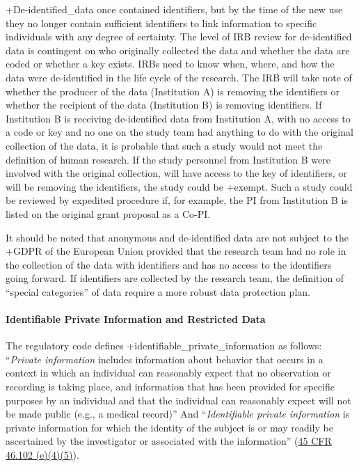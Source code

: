 \documentclass[
]{book}
\begin{document}
+De-identified\_data\textbar{} once contained identifiers, but by the time of the new use they no longer contain sufficient identifiers to link information to specific individuals with any degree of certainty. The level of IRB review for de-identified data is contingent on who originally collected the data and whether the data are coded or whether a key exists. IRBs need to know when, where, and how the data were de-identified in the life cycle of the research. The IRB will take note of whether the producer of the data (Institution A) is removing the identifiers or whether the recipient of the data (Institution B) is removing identifiers. If Institution B is receiving de-identified data from Institution A, with no access to a code or key and no one on the study team had anything to do with the original collection of the data, it is probable that such a study would not meet the definition of human research. If the study personnel from Institution B were involved with the original collection, will have access to the key of identifiers, or will be removing the identifiers, the study could be +exempt\textbar. Such a study could be reviewed by expedited procedure if, for example, the PI from Institution B is listed on the original grant proposal as a Co-PI.

\begin{bbox}

It should be noted that anonymous and de-identified data are not subject to the +GDPR\textbar{} of the European Union provided that the research team had no role in the collection of the data with identifiers and has no access to the identifiers going forward. If identifiers are collected by the research team, the definition of ``special categories'' of data require a more robust data protection plan.

\end{bbox}

\hypertarget{identifiable-private-information-and-restricted-data}{%
\paragraph{Identifiable Private Information and Restricted Data}\label{identifiable-private-information-and-restricted-data}}

The regulatory code defines +identifiable\_private\_information\textbar{} as follows: ``\emph{Private information} includes information about behavior that occurs in a context in which an individual can reasonably expect that no observation or recording is taking place, and information that has been provided for specific purposes by an individual and that the individual can reasonably expect will not be made public (e.g., a medical record)'' And ``\emph{Identifiable private information} is private information for which the identity of the subject is or may readily be ascertained by the investigator or associated with the information'' (\href{https://www.law.cornell.edu/cfr/text/45/46.102}{45 CFR 46.102 (e)(4)(5)}).
\end{document}
